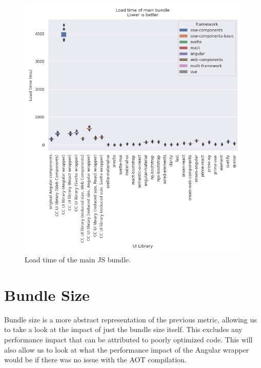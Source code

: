 \begin{figure}[h]
  \includegraphics[width=\columnwidth]{plots/load-time-all.png}
  \caption{Load time of the main JS bundle.}
  \label{fig:results:load-time-all}
  \centering
\end{figure}

\section{Bundle Size}
Bundle size is a more abstract representation of the previous metric, allowing us to take a look at the impact of just the bundle size itself. This excludes any performance impact that can be attributed to poorly optimized code. This will also allow us to look at what the performance impact of the Angular wrapper would be if there was no issue with the AOT compilation.

